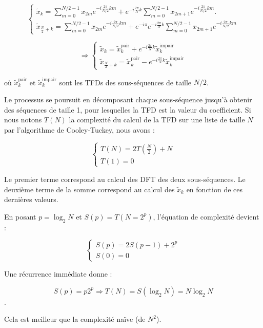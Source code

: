 \documentclass[11pt,oneside]{article}
\begin{document}
$$\begin{cases} \tilde x_k =  \sum_{m=0}^{N/2-1} x_{2m} e^{-i \frac{2\pi}{N/2} km} + e^{-i \frac{2\pi}{N} k} \sum_{m=0}^{N/2-1} x_{2m+1} e^{-i \frac{2\pi}{N/2} km}.  \\
\tilde x_{\frac{N}{2} + k} = \sum_{m=0}^{N/2-1} x_{2m} e^{-i \frac{2\pi}{N/2} km} + e^{-i \pi} e^{-i \frac{2\pi}{N} k} \sum_{m=0}^{N/2-1} x_{2m+1} e^{-i \frac{2\pi}{N/2} km}
\end{cases}$$



$$ \Rightarrow \begin{cases} \tilde x_k =  \tilde x_k^{\text{pair}} + e^{-i \frac{2\pi}{N} k} \tilde x_k^{\text{impair}}  \\
\tilde x_{\frac{N}{2} + k} = \tilde x_k^{\text{pair}} - e^{-i \frac{2\pi}{N} k} \tilde x_k^{\text{impair}}
\end{cases}$$

où $\tilde x_k^{\text{pair}}$ et $\tilde x_k^{\text{impair}}$ sont les TFDs des sous-séquences de taille $N/2$.

Le processus se poursuit en décomposant chaque sous-séquence jusqu'à obtenir des séquences de taille 1, pour lesquelles la TFD est la valeur du coefficient. Si nous notons $T(N)$ la complexité du calcul de la TFD sur une liste de taille $N$ par l'algorithme de Cooley-Tuckey, nous avons :

$$\begin{cases}
    T(N) = 2T(\frac{N}{2}) + N \\
    T(1) = 0
\end{cases}$$

Le premier terme correspond au calcul des DFT des deux sous-séquences. Le deuxième terme de la somme correspond au calcul des $\tilde x_k$ en fonction de ces dernières valeurs.

En posant $p = \log_2 N$ et $S(p) = T(N=2^p)$, l'équation de complexité devient :

$$
\begin{cases}
S(p) = 2 S(p-1) + 2^p \\
S(0) = 0
\end{cases}
$$

Une récurrence immédiate donne : 

$$S(p) = p 2^p \Rightarrow T(N) = S(\log_2 N) =  N \log_2 N$$.

Cela est meilleur que la complexité naïve (de $N^2$).


\end{document}
